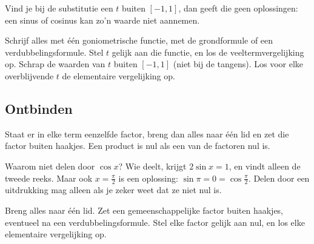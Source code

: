 Vind je bij de substitutie een $t$ buiten $[-1, 1]$, dan geeft die geen oplossingen: een sinus of cosinus kan zo'n waarde niet aannemen.

\begin{werkwijze}
Schrijf alles met één goniometrische functie, met de grondformule of een verdubbelingsformule. Stel $t$ gelijk aan die functie, en los de veeltermvergelijking op. Schrap de waarden van $t$ buiten $[-1, 1]$ (niet bij de tangens). Los voor elke overblijvende $t$ de elementaire vergelijking op.
\end{werkwijze}

\begin{oefeningen}
\end{oefeningen}

\subsection{Ontbinden}

Staat er in elke term eenzelfde factor, breng dan alles naar één lid en zet die factor buiten haakjes. Een product is nul als een van de factoren nul is.


Waarom niet delen door $\cos x$? Wie deelt, krijgt $2\sin x = 1$, en vindt alleen de tweede reeks. Maar ook $x = \frac{\pi}{2}$ is een oplossing: $\sin\pi = 0 = \cos\frac{\pi}{2}$. Delen door een uitdrukking mag alleen als je zeker weet dat ze niet nul is.

\begin{werkwijze}
Breng alles naar één lid. Zet een gemeenschappelijke factor buiten haakjes, eventueel na een verdubbelingsformule. Stel elke factor gelijk aan nul, en los elke elementaire vergelijking op.
\end{werkwijze}

